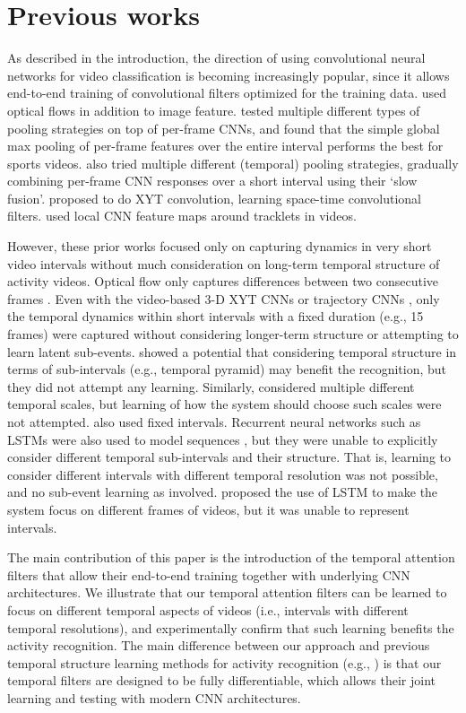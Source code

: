 \documentclass[letterpaper]{article}
\begin{document}
\section{Previous works}

As described in the introduction, the direction of using convolutional neural networks for video classification is becoming increasingly popular, since it allows end-to-end training of convolutional filters optimized for the training data. \cite{simonyan14} used optical flows in addition to image feature. \cite{google15} tested multiple different types of pooling strategies on top of per-frame CNNs, and found that the simple global max pooling of per-frame features over the entire interval performs the best for sports videos. \cite{karpathy14} also tried multiple different (temporal) pooling strategies, gradually combining per-frame CNN responses over a short interval using their `slow fusion'. \cite{c3d} proposed to do XYT convolution, learning space-time convolutional filters. \cite{tdd15} used local CNN feature maps around tracklets in videos.

However, these prior works focused only on capturing dynamics in very short video intervals without much consideration on long-term temporal structure of activity videos. Optical flow only captures differences between two consecutive frames \cite{simonyan14}. Even with the video-based 3-D XYT CNNs \cite{c3d} or trajectory CNNs \cite{tdd15}, only the temporal dynamics within short intervals with a fixed duration (e.g., 15 frames) were captured without considering longer-term structure or attempting to learn latent sub-events. \cite{ryoo15} showed a potential that considering temporal structure in terms of sub-intervals (e.g., temporal pyramid) may benefit the recognition, but they did not attempt any learning. Similarly, \cite{li16} considered multiple different temporal scales, but learning of how the system should choose such scales were not attempted. \cite{varol16} also used fixed intervals. Recurrent neural networks such as LSTMs were also used to model sequences \cite{google15}, but they were unable to explicitly consider different temporal sub-intervals and their structure. That is, learning to consider different intervals with different temporal resolution was not possible, and no sub-event learning as involved. \cite{yeong16} proposed the use of LSTM to make the system focus on different frames of videos, but it was unable to represent intervals.

The main contribution of this paper is the introduction of the temporal attention filters that allow their end-to-end training together with underlying CNN architectures. We illustrate that our temporal attention filters can be learned to focus on different temporal aspects of videos (i.e., intervals with different temporal resolutions), and experimentally confirm that such learning benefits the activity recognition. The main difference between our approach and previous temporal structure learning methods for activity recognition (e.g., \cite{niebles10,ryoo13}) is that our temporal filters are designed to be fully differentiable, which allows their joint learning and testing with modern CNN architectures.
\end{document}

